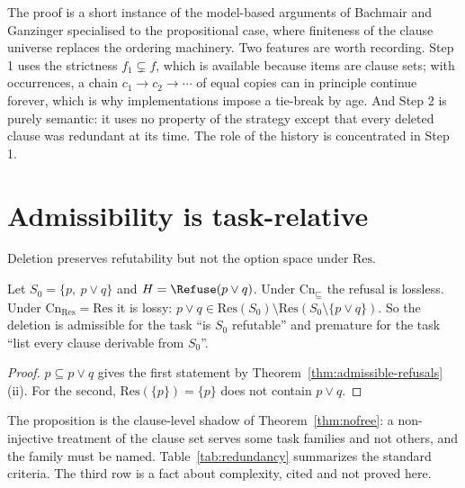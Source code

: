 The proof is a short instance of the model-based arguments of Bachmair and Ganzinger \cite{bachmairganzinger1994} specialised to the propositional case, where finiteness of the clause universe replaces the ordering machinery. Two features are worth recording. Step 1 uses the strictness $f_1\subsetneq f$, which is available because items are clause sets; with occurrences, a chain $c_1\to c_2\to\cdots$ of equal copies can in principle continue forever, which is why implementations impose a tie-break by age. And Step 2 is purely semantic: it uses no property of the strategy except that every deleted clause was redundant at its time. The role of the history is concentrated in Step 1.

\section{Admissibility is task-relative}

Deletion preserves refutability but not the option space under $\mathrm{Res}$.

\begin{proposition}
\label{prop:wrong-task}
Let $S_0=\{p,\ p\vee q\}$ and $H=\Refuse(p\vee q)$. Under $\mathrm{Cn}_{\sqsubseteq}$ the refusal is lossless. Under $\mathrm{Cn}_{\mathrm{Res}}=\mathrm{Res}$ it is lossy: $p\vee q\in\mathrm{Res}(S_0)\setminus\mathrm{Res}(S_0\setminus\{p\vee q\})$. So the deletion is admissible for the task ``is $S_0$ refutable'' and premature for the task ``list every clause derivable from $S_0$''.
\end{proposition}

\begin{proof}
$p\subseteq p\vee q$ gives the first statement by Theorem~\ref{thm:admissible-refusals}(ii). For the second, $\mathrm{Res}(\{p\})=\{p\}$ does not contain $p\vee q$.
\end{proof}

The proposition is the clause-level shadow of Theorem~\ref{thm:nofree}: a non-injective treatment of the clause set serves some task families and not others, and the family must be named. Table~\ref{tab:redundancy} summarizes the standard criteria. The third row is a fact about complexity, cited and not proved here.

